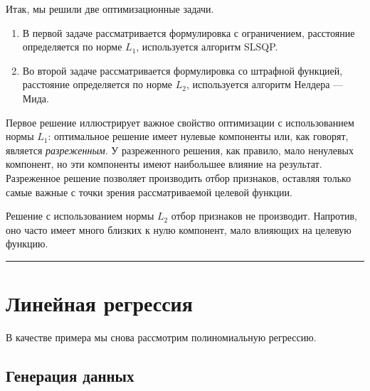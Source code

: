 \documentclass[11pt,a4paper]{article}
\providecommand{\tightlist}{%
  \setlength{\itemsep}{0pt}\setlength{\parskip}{0pt}}
\begin{document}
    \begin{center}
    \end{center}

Итак, мы решили две оптимизационные задачи.

\begin{enumerate}
\def\labelenumi{\arabic{enumi}.}
\tightlist
\item
  В первой задаче рассматривается формулировка с ограничением,
  расстояние определяется по норме \(L_1\), используется алгоритм SLSQP.
\item
  Во второй задаче рассматривается формулировка со штрафной функцией,
  расстояние определяется по норме \(L_2\), используется алгоритм
  Нелдера --- Мида.
\end{enumerate}

Первое решение иллюстрирует важное свойство оптимизации с использованием
нормы \(L_1\): оптимальное решение имеет нулевые компоненты или, как
говорят, является \emph{разреженным}.
У разреженного решения, как правило, мало ненулевых компонент, но эти компоненты имеют наибольшее влияние на результат.
Разреженное решение позволяет производить отбор признаков, оставляя только самые важные с точки зрения рассматриваемой
целевой функции.

Решение с использованием нормы \(L_2\) отбор признаков не производит.
Напротив, оно часто имеет много близких к нулю компонент, мало влияющих на целевую функцию.

    \begin{center}\rule{0.5\linewidth}{0.5pt}\end{center}

    \hypertarget{ux43bux438ux43dux435ux439ux43dux430ux44f-ux440ux435ux433ux440ux435ux441ux441ux438ux44f}{%
\section{Линейная
регрессия}\label{ux43bux438ux43dux435ux439ux43dux430ux44f-ux440ux435ux433ux440ux435ux441ux441ux438ux44f}}

В качестве примера мы снова рассмотрим полиномиальную регрессию.

    \hypertarget{ux433ux435ux43dux435ux440ux430ux446ux438ux44f-ux434ux430ux43dux43dux44bux445}{%
\subsection{Генерация
данных}\label{ux433ux435ux43dux435ux440ux430ux446ux438ux44f-ux434ux430ux43dux43dux44bux445}}
\end{document}

